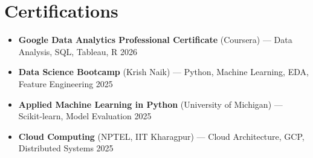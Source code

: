 \documentclass[10pt,letterpaper]{article}
\begin{document}
\section{Certifications}
\begin{itemize}[leftmargin=1.1em, itemsep=0.5pt, parsep=0pt, topsep=1.5pt]
  \item \textbf{Google Data Analytics Professional Certificate} (Coursera) --- Data Analysis, SQL, Tableau, R \hfill {\small 2026}
  \item \textbf{Data Science Bootcamp} (Krish Naik) --- Python, Machine Learning, EDA, Feature Engineering \hfill {\small 2025}
  \item \textbf{Applied Machine Learning in Python} (University of Michigan) --- Scikit-learn, Model Evaluation \hfill {\small 2025}
  \item \textbf{Cloud Computing} (NPTEL, IIT Kharagpur) --- Cloud Architecture, GCP, Distributed Systems \hfill {\small 2025}
\end{itemize}
\end{document}

